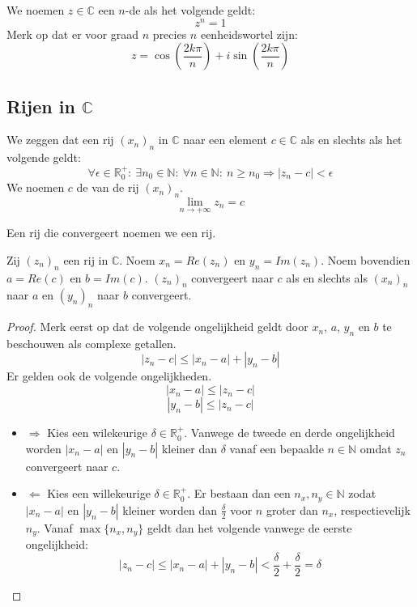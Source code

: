 \documentclass[main.tex]{subfiles}
\begin{document}
\begin{de}
  We noemen $z\in \mathbb{C}$ een $n$-de  als het volgende geldt:
  \[ z^{n} = 1 \]
  Merk op dat er voor graad $n$ precies $n$ eenheidswortel zijn:
  \[ z = \cos\left(\frac{2k\pi}{n}\right) + i \sin \left( \frac{2k\pi}{n} \right) \]
\end{de}


\subsection{Rijen in $\mathbb{C}$}
\label{sec:rijen-mathbbc}

\begin{de}
  We zeggen dat een rij $(x_{n})_{n}$ in $\mathbb{C}$  naar een element $c\in \mathbb{C}$ als en slechts als het volgende geldt:
  \[ \forall \epsilon \in \mathbb{R}_{0}^{+}:\ \exists n_{0}\in \mathbb{N}:\ \forall n\in \mathbb{N}:\ n \ge n_{0} \Rightarrow |z_{n}-c| < \epsilon \]
  We noemen $c$ de  van de rij $(x_{n})_{n}$.
  \[ \lim_{n\rightarrow +\infty}z_{n} = c \]
\end{de}

\begin{de}
  Een rij die convergeert noemen we een  rij.
\end{de}

\begin{pr}
  \label{pr:complexe-limiet-splitsen}
  Zij $(z_{n})_{n}$ een rij in $\mathbb{C}$.
  Noem $x_{n} = Re(z_{n})$ en $y_{n} = Im(z_{n})$.
  Noem bovendien $a=Re(c)$ en $b=Im(c)$.
  $(z_{n})_{n}$ convergeert naar $c$ als en slechts als $(x_{n})_{n}$ naar $a$ en $(y_{n})_{n}$ naar $b$ convergeert.

  \begin{proof}
    Merk eerst op dat de volgende ongelijkheid geldt door $x_{n}$, $a$, $y_{n}$ en $b$ te beschouwen als complexe getallen.
    \[ |z_{n}-c| \le |x_{n}-a| + |y_{n}-b| \]
    Er gelden ook de volgende ongelijkheden.
    \[ |x_{n}-a| \le |z_{n}-c| \]
    \[ |y_{n}-b| \le |z_{n}-c| \]
    \begin{itemize}
    \item $\Rightarrow$
      Kies een wilekeurige $\delta \in \mathbb{R}_{0}^{+}$.
      Vanwege de tweede en derde ongelijkheid worden $|x_{n}-a|$ en $|y_{n}-b|$ kleiner dan $\delta$ vanaf een bepaalde $n\in \mathbb{N}$ omdat $z_{n}$ convergeert naar $c$.
    \item $\Leftarrow$
      Kies een willekeurige $\delta \in \mathbb{R}_{0}^{+}$.
      Er bestaan dan een $n_{x},n_{y}\in \mathbb{N}$ zodat $|x_{n}-a|$ en $|y_{n}-b|$ kleiner worden dan $\frac{\delta}{2}$ voor $n$ groter dan $n_{x}$, respectievelijk $n_{y}$.
      Vanaf $\max\{n_{x},n_{y}\}$ geldt dan het volgende vanwege de eerste ongelijkheid:
      \[ |z_{n}-c| \le |x_{n}-a| + |y_{n}-b| < \frac{\delta}{2}+\frac{\delta}{2} = \delta \]
    \end{itemize}
  \end{proof}
\end{pr}
\end{document}
